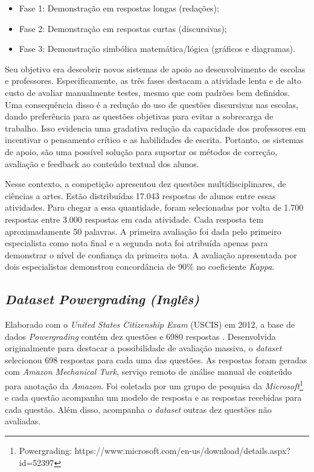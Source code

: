 \begin{itemize}
\item Fase 1:  Demonstração em respostas longas (redações); 
\item Fase 2:  Demonstração em respostas curtas (discursivas);
\item Fase 3:  Demonstração simbólica matemática/lógica (gráficos e diagramas).
\end{itemize}

Seu objetivo era descobrir novos sistemas de apoio ao desenvolvimento de escolas e professores. Especificamente, as três fases destacam a atividade lenta e de alto custo de avaliar manualmente testes, mesmo que com padrões bem definidos. Uma consequência disso é a redução do uso de questões discursivas nas escolas, dando preferência para as questões objetivas para evitar a sobrecarga de trabalho. Isso evidencia uma gradativa redução da capacidade dos professores em incentivar o pensamento crítico e as habilidades de escrita. Portanto, os sistemas de apoio, são uma possível solução para suportar os métodos de correção, avaliação e feedback ao conteúdo textual dos alunos.

Nesse contexto, a competição apresentou dez questões multidisciplinares, de ciências a artes. Estão distribuídas 17.043 respostas de alunos entre essas atividades. Para chegar a essa quantidade, foram selecionadas por volta de 1.700 respostas entre 3.000 respostas em cada atividade. Cada resposta tem aproximadamente 50 palavras. A primeira avaliação foi dada pelo primeiro especialista como nota final e a segunda nota foi atribuída apenas para demonstrar o nível de confiança da primeira nota. A avaliação apresentada por dois especialistas demonstrou concordância de 90\% no coeficiente \textit{Kappa}.


\subsection{\textit{Dataset} \textit{Powergrading} \textit{(Inglês)}}
\label{powergrading-db}
Elaborado com o \textit{United States Citizenship Exam} (USCIS) em 2012, a base de dados \textit{Powergrading} contém dez questões e 6980 respostas \cite{basu2013}. Desenvolvida originalmente para destacar a possibilidade de avaliação massiva, o \textit{dataset} selecionou 698 respostas para cada uma das questões. As respostas foram geradas com \textit{Amazon Mechanical Turk}, serviço remoto de análise manual de conteúdo para anotação da \textit{Amazon}. Foi coletada por um grupo de pesquisa da \textit{Microsoft}\footnote{Powergrading: https://www.microsoft.com/en-us/download/details.aspx?id=52397} e cada questão acompanha um modelo de resposta e as respostas recebidas para cada questão.  Além disso, acompanha o \textit{dataset} outras dez questões não avaliadas.

